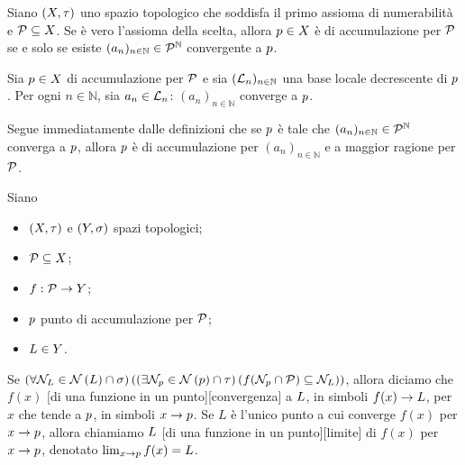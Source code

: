 \begin{Theorem}
	Siano $(X,\tau)$ uno spazio topologico che soddisfa il primo assioma di numerabilit\`a e $\mathcal{P} \subseteq X$. Se \`e vero l'assioma della scelta, allora $p \in X$ \`e di accumulazione per $\mathcal{P}$ se e solo se esiste $(a_n)_{n \in \mathbb{N}} \in \mathcal{P}^\mathbb{N}$ convergente a $p$.
\end{Theorem}
\Proof Sia $p \in X$ di accumulazione per $\mathcal{P}$ e sia $(\mathcal{L}_n)_{n \in \mathbb{N}}$ una base locale decrescente di $p$. Per ogni $n \in \mathbb{N}$, sia $a_n \in \mathcal{L}_n$: $(a_n)_{n \in \mathbb{N}}$ converge a $p$.
\par Segue immediatamente dalle definizioni che se $p$ \`e tale che $(a_n)_{n \in \mathbb{N}} \in \mathcal{P}^\mathbb{N}$ converga a $p$, allora $p$ \`e di accumulazione per $(a_n)_{n \in \mathbb{N}}$ e a maggior ragione per $\mathcal{P}$. \EndProof
\begin{Definition}
	Siano
	\begin{itemize}
		\item $(X,\tau)$ e $(Y,\sigma)$ spazi topologici;
		\item $\mathcal{P} \subseteq X$;
		\item $f: \mathcal{P} \rightarrow Y$;
		\item $p$ punto di accumulazione per $\mathcal{P}$;
		\item $L \in Y$.
	\end{itemize}
	Se $\ForAll{\Neighborhood_\Limit \in \Neighborhoods{\Limit} \cap \VarTopology}{\Exists{\Neighborhood_\AccumulationPoint \in \Neighborhoods{\AccumulationPoint} \cap \Topology}{f(\Neighborhood_\AccumulationPoint \cap \Part) \subseteq \Neighborhood_\Limit}}$, allora diciamo che $f(x)$ [di una funzione in un punto][convergenza] a $L$, in simboli $f(x) \rightarrow L$, per $x$ che tende a $p$, in simboli $x \rightarrow p$. Se $L$ \`e l'unico punto a cui converge $f(x)$ per $x \rightarrow p$, allora chiamiamo $L$ [di una funzione in un punto][limite] di $f(x)$ per $x \rightarrow p$, denotato $\lim_{x \rightarrow p} f(x) = L$.
\end{Definition}
